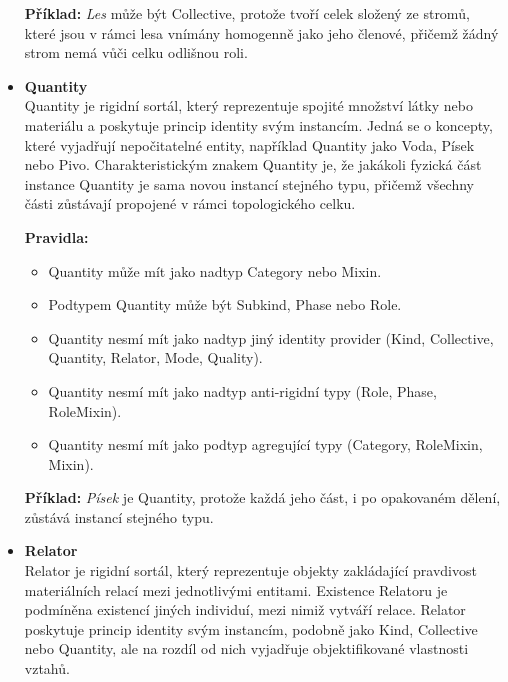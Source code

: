 \begin{itemize}
  \textbf{Příklad:} \textit{Les} může být Collective, protože tvoří celek složený ze stromů, které jsou v rámci lesa vnímány homogenně jako jeho členové, přičemž žádný strom nemá vůči celku odlišnou roli.


  \item \textbf{Quantity} \\
  Quantity je rigidní sortál, který reprezentuje spojité množství látky nebo materiálu a poskytuje princip identity svým instancím. Jedná se o koncepty, které vyjadřují nepočitatelné entity, například Quantity jako Voda, Písek nebo Pivo. Charakteristickým znakem Quantity je, že jakákoli fyzická část instance Quantity je sama novou instancí stejného typu, přičemž všechny části zůstávají propojené v rámci topologického celku. \cite{KOM_prezentace4,ontouml_class_stereotypes}

  \textbf{Pravidla:}
  \begin{itemize}
    \item Quantity může mít jako nadtyp Category nebo Mixin.
    \item Podtypem Quantity může být Subkind, Phase nebo Role.
    \item Quantity nesmí mít jako nadtyp jiný identity provider (Kind, Collective, Quantity, Relator, Mode, Quality).
    \item Quantity nesmí mít jako nadtyp anti-rigidní typy (Role, Phase, RoleMixin).
    \item Quantity nesmí mít jako podtyp agregující typy (Category, RoleMixin, Mixin). \cite{ontouml_class_stereotypes}
  \end{itemize}

  \textbf{Příklad:} \textit{Písek} je Quantity, protože každá jeho část, i po opakovaném dělení, zůstává instancí stejného typu. 


  \item \textbf{Relator} \\
  Relator je rigidní sortál, který reprezentuje objekty zakládající pravdivost materiálních relací mezi jednotlivými entitami. Existence Relatoru je podmíněna existencí jiných individuí, mezi nimiž vytváří relace. Relator poskytuje princip identity svým instancím, podobně jako Kind, Collective nebo Quantity, ale na rozdíl od nich vyjadřuje objektifikované vlastnosti vztahů. \cite{KOM_prezentace3,ontouml_class_stereotypes}


\end{itemize}
